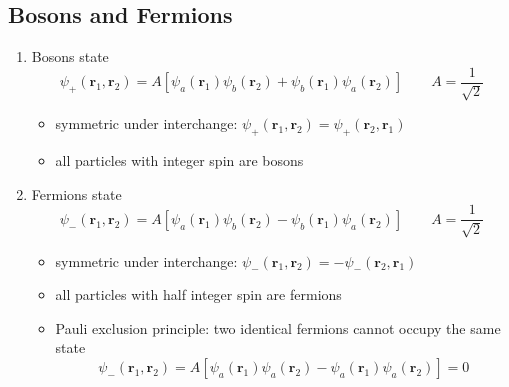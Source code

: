 \subsection{Bosons and Fermions}
\begin{enumerate}
	\item Bosons state
	\[\psi_+(\mathbf{r}_1,\mathbf{r}_2)=A[\psi_a(\mathbf{r}_1)\psi_b(\mathbf{r}_2 )
	                                       +\psi_b(\mathbf{r}_1)\psi_a(\mathbf{r}_2) ]\qquad A=\frac{1}{\sqrt{2}}\]
	\begin{itemize}
		\item symmetric under interchange: \(\psi_+(\mathbf{r}_1,\mathbf{r}_2)=\psi_+(\mathbf{r}_2,\mathbf{r}_1)\)
        \item all particles with integer spin are bosons
	\end{itemize}								   
    \item Fermions state
    \[\psi_-(\mathbf{r}_1,\mathbf{r}_2)=A[\psi_a(\mathbf{r}_1)\psi_b(\mathbf{r}_2 )
	                                       -\psi_b(\mathbf{r}_1)\psi_a(\mathbf{r}_2 )]\qquad A=\frac{1}{\sqrt{2}}\]
	\begin{itemize}
        \item symmetric under interchange: \(\psi_-(\mathbf{r}_1,\mathbf{r}_2)=-\psi_-(\mathbf{r}_2,\mathbf{r}_1)\)
		\item all particles with half integer spin are fermions
  \item Pauli exclusion principle: two identical fermions cannot occupy the same state
  \[\psi_-(\mathbf{r}_1,\mathbf{r}_2)=A[\psi_a(\mathbf{r}_1)\psi_a(\mathbf{r}_2 )
	                                       -\psi_a(\mathbf{r}_1)\psi_a(\mathbf{r}_2 )]=0\]
	\end{itemize}	
\end{enumerate}
